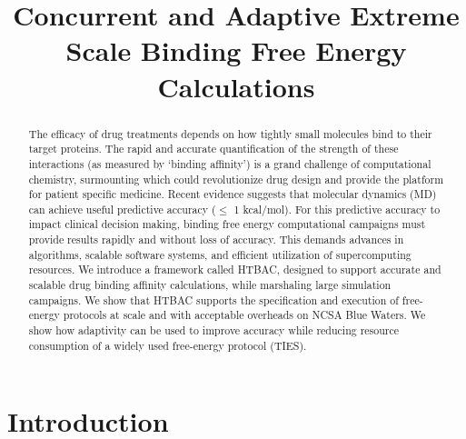 \documentclass[conference]{IEEEtran}
\begin{document}
\title{Concurrent and Adaptive Extreme Scale Binding Free Energy
Calculations}

\author{
}

\maketitle

\begin{abstract}
The efficacy of drug treatments depends on how tightly small molecules bind to
their target proteins. The rapid and accurate quantification of the strength
of these interactions (as measured by `binding affinity’) is a grand challenge
of computational chemistry, surmounting which could revolutionize drug design
and provide the platform for patient specific medicine. Recent evidence
suggests that molecular dynamics (MD) can achieve useful predictive accuracy
($\leq$ 1 kcal/mol). For this predictive accuracy to impact clinical decision
making, binding free energy computational campaigns must provide results
rapidly and without loss of accuracy. This demands advances in algorithms,
scalable software systems, and efficient utilization of supercomputing
resources. We introduce a framework called HTBAC, designed to support accurate
and scalable drug binding affinity calculations, while marshaling large
simulation campaigns. We show that HTBAC supports the specification and
execution of free-energy protocols at scale and with acceptable overheads on
NCSA Blue Waters. We show how adaptivity can be used to improve accuracy while
reducing resource consumption of a widely used free-energy protocol (TIES).
\end{abstract}


\section{Introduction}\label{sec:intro}

\end{document}
